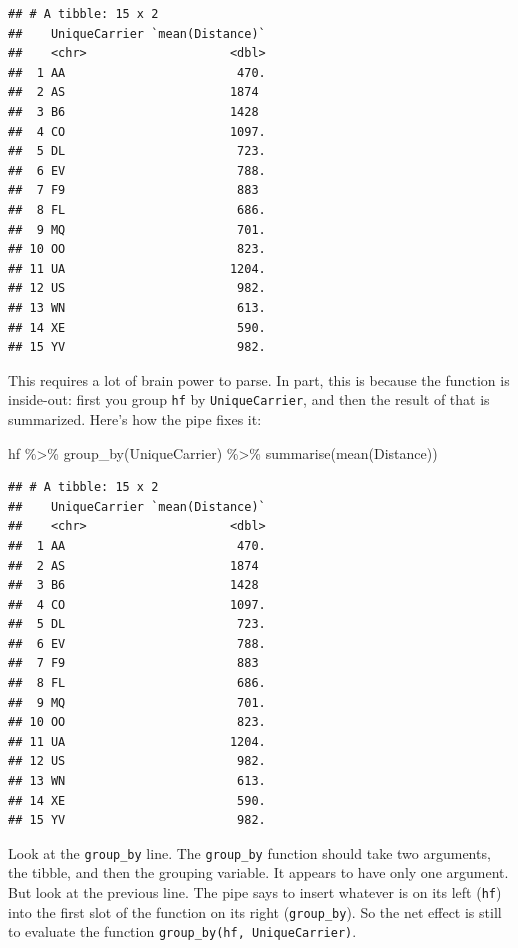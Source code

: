 \documentclass[
]{book}
\newenvironment{Shaded}{\begin{snugshade}}{\end{snugshade}}
\newcommand{\FunctionTok}[1]{\textcolor[rgb]{0.00,0.00,0.00}{#1}}
\newcommand{\NormalTok}[1]{#1}
\newcommand{\SpecialCharTok}[1]{\textcolor[rgb]{0.00,0.00,0.00}{#1}}
\begin{document}
\begin{verbatim}
## # A tibble: 15 x 2
##    UniqueCarrier `mean(Distance)`
##    <chr>                    <dbl>
##  1 AA                        470.
##  2 AS                       1874 
##  3 B6                       1428 
##  4 CO                       1097.
##  5 DL                        723.
##  6 EV                        788.
##  7 F9                        883 
##  8 FL                        686.
##  9 MQ                        701.
## 10 OO                        823.
## 11 UA                       1204.
## 12 US                        982.
## 13 WN                        613.
## 14 XE                        590.
## 15 YV                        982.
\end{verbatim}

This requires a lot of brain power to parse. In part, this is because the function is inside-out: first you group \texttt{hf} by \texttt{UniqueCarrier}, and then the result of that is summarized. Here's how the pipe fixes it:

\begin{Shaded}
\begin{Highlighting}[]
\NormalTok{hf }\SpecialCharTok{\%\textgreater{}\%}
    \FunctionTok{group\_by}\NormalTok{(UniqueCarrier) }\SpecialCharTok{\%\textgreater{}\%}
    \FunctionTok{summarise}\NormalTok{(}\FunctionTok{mean}\NormalTok{(Distance))}
\end{Highlighting}
\end{Shaded}

\begin{verbatim}
## # A tibble: 15 x 2
##    UniqueCarrier `mean(Distance)`
##    <chr>                    <dbl>
##  1 AA                        470.
##  2 AS                       1874 
##  3 B6                       1428 
##  4 CO                       1097.
##  5 DL                        723.
##  6 EV                        788.
##  7 F9                        883 
##  8 FL                        686.
##  9 MQ                        701.
## 10 OO                        823.
## 11 UA                       1204.
## 12 US                        982.
## 13 WN                        613.
## 14 XE                        590.
## 15 YV                        982.
\end{verbatim}

Look at the \texttt{group\_by} line. The \texttt{group\_by} function should take two arguments, the tibble, and then the grouping variable. It appears to have only one argument. But look at the previous line. The pipe says to insert whatever is on its left (\texttt{hf}) into the first slot of the function on its right (\texttt{group\_by}). So the net effect is still to evaluate the function \texttt{group\_by(hf,\ UniqueCarrier)}.
\end{document}
